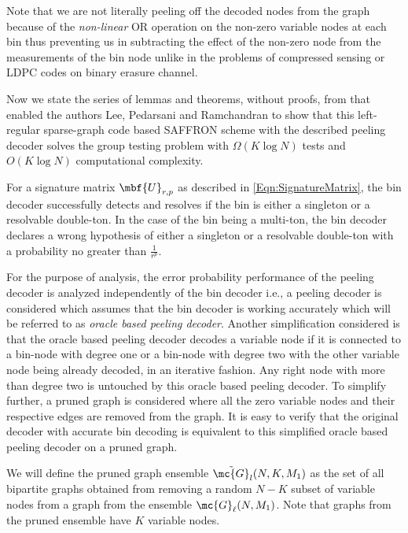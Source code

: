 \documentclass[conference,,twocolumn]{IEEEtran}
\begin{document}
\begin{Remark}
 Note that we are not literally peeling off the decoded nodes from the graph because of the \textit{non-linear} OR operation on the non-zero variable nodes at each bin thus preventing us in subtracting the effect of the non-zero node from the measurements of the bin node unlike in the problems of compressed sensing or LDPC codes on binary erasure channel.
\end{Remark}

Now we state the series of lemmas and theorems, without proofs, from \cite{lee2015saffron} that enabled the authors Lee, Pedarsani and Ramchandran to show that this left-regular sparse-graph code based SAFFRON scheme with the described peeling decoder solves the group testing problem with $\Omega( K\log N)$ tests and $O(K\log N)$ computational complexity.

\begin{lemma}
\label{Lem:BinDecoderAnalysis}
For a signature matrix $\mbf{U}_{r,p}$ as described in \eqref{Eqn:SignatureMatrix}, the bin decoder successfully detects and resolves if the bin is either a singleton or a resolvable double-ton. In the case of the bin being a multi-ton, the bin decoder declares a wrong hypothesis of either a singleton or a resolvable double-ton with a probability no greater than $\frac{1}{r^p}$.
\end{lemma}

For the purpose of analysis, the error probability performance of the peeling decoder is analyzed independently of the bin decoder i.e., a peeling decoder is considered which assumes that the bin decoder is working accurately which will be referred to as \textit{oracle based peeling decoder}. Another simplification considered is that the oracle based peeling decoder decodes a variable node if it is connected to a bin-node with degree one or a bin-node with degree two with the other variable node being already decoded, in an iterative fashion. Any right node with more than degree two is untouched by this oracle based peeling decoder. To simplify further, a pruned graph is considered where all the zero variable nodes and their respective edges are removed from the graph. It is easy to verify that the original decoder with accurate bin decoding is equivalent to this simplified oracle based peeling decoder on a pruned graph.

\begin{definition}
We will define the pruned graph ensemble $\tilde{\mc{G}}_l(N,K,M_1)$ as the set of all bipartite graphs obtained from removing a random $N-K$ subset of variable nodes from a graph from the ensemble $\mc{G}_{\ell}(N,M_1)$. Note that graphs from the pruned ensemble have $K$ variable nodes. 
\end{definition}	
\end{document}
